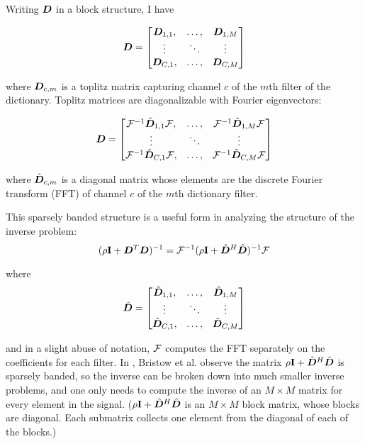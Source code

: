 Writing $\bm{D}$ in a block structure, I have

\begin{equation}
\bm{D} = \begin{bmatrix}
\bm{D}_{1,1}, & \hdots, & \bm{D}_{1,M}\\
\vdots & \ddots & \vdots\\
\bm{D}_{C,1}, & \hdots, & \bm{D}_{C,M}
\end{bmatrix}
\end{equation}

where $\bm{D}_{c,m}$ is a toplitz matrix capturing channel $c$ of the $m$th filter of the dictionary. Toplitz matrices are diagonalizable with Fourier eigenvectors:

\begin{equation}
\bm{D} = \begin{bmatrix}
\mathcal{F}^{-1}\hat{\bm{D}}_{1,1}\mathcal{F}, & \hdots, & \mathcal{F}^{-1}\hat{\bm{D}}_{1,M}\mathcal{F}\\
\vdots & \ddots & \vdots\\
\mathcal{F}^{-1}\hat{\bm{D}}_{C,1}\mathcal{F}, & \hdots, & \mathcal{F}^{-1}\hat{\bm{D}}_{C,M}\mathcal{F}
\end{bmatrix}
\end{equation}

where $\hat{\bm{D}}_{c,m}$ is a diagonal matrix whose elements are the discrete Fourier transform (FFT) of channel $c$ of the $m$th dictionary filter.

This sparsely banded structure is a useful form in analyzing the structure of the inverse problem:
\begin{equation}
(\rho {\bf I} + \bm{D}^T\bm{D})^{-1} = \mathcal{F}^{-1}(\rho{\bf I} + \hat{\bm{D}}^H\hat{\bm{D}})^{-1}\mathcal{F}
\end{equation}

where
\begin{equation}
\hat{\bm{D}} = \begin{bmatrix}
\hat{\bm{D}}_{1,1}, & \hdots, & \hat{\bm{D}}_{1,M}\\
\vdots & \ddots & \vdots\\
\hat{\bm{D}}_{C,1}, & \hdots, & \hat{\bm{D}}_{C,M}
\end{bmatrix}
\end{equation}

and in a slight abuse of notation, $\mathcal{F}$ computes the FFT separately on the coefficients for each filter.  In \cite{Bristow2013fast}, Bristow et al. observe the matrix $\rho{\bf I} + \hat{\bm{D}}^H\hat{\bm{D}}$ is sparsely banded, so the inverse can be broken down into much smaller inverse problems, and one only needs to compute the inverse of an $M \times M$ matrix for every element in the signal. ($\rho{\bf I} + \hat{\bm{D}}^H\hat{\bm{D}}$ is an $M \times M$ block matrix, whose blocks are diagonal.  Each submatrix collects one element from the diagonal of each of the blocks.)

